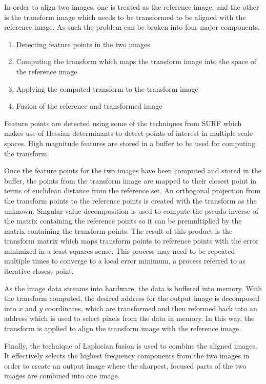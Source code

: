 \documentclass{article}
\begin{document}
In order to align two images, one is treated as the reference image, and the other is the transform image which needs to be transformed to be aligned with the reference image. As such the problem can be broken into four major components. 

\begin{enumerate}
	\item Detecting feature points in the two images
	\item Computing the transform which maps the transform image into the space of the reference image
	\item Applying the computed transform to the transform image
	\item Fusion of the reference and transformed image
\end{enumerate}

Feature points are detected using some of the techniques from SURF which makes use of Hessian determinants to detect points of interest in multiple scale spaces. High magnitude features are stored in a buffer to be used for computing the transform.

Once the feature points for the two images have been computed and stored in the buffer, the points from the transform image are mapped to their closest point in terms of euclidean distance from the reference set. An orthogonal projection from the transform points to the reference points is created with the transform as the unknown. Singular value decomposition is used to compute the pseudo-inverse of the matrix containing the reference points so it can be premultiplied by the matrix containing the transform points. The result of this product is the transform matrix which maps transform points to reference points with the error minimized in a least-squares sense. This process may need to be repeated multiple times to converge to a local error minimum, a process referred to as iterative closest point.

As the image data streams into hardware, the data is buffered into memory. With the transform computed, the desired address for the output image is decomposed into $x$ and $y$ coordinates, which are transformed and then reformed back into an address which is used to select pixels from the data in memory. In this way, the transform is applied to align the transform image with the reference image.

Finally, the technique of Laplacian fusion is used to combine the aligned images. It effectively selects the highest frequency components from the two images in order to create an output image where the sharpest, focused parts of the two images are combined into one image.
\end{document}
